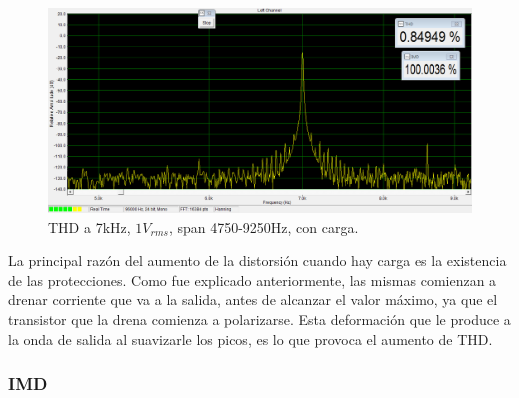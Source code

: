 \begin{figure}[H]
\centering
\includegraphics[width=\textwidth]{img/Distorsion/THD_7k_1V_carga_span_4750_9250.png}
\caption{THD a 7kHz, $1V_{rms}$, span 4750-9250Hz, con carga.}
\label{THD8} 
\end{figure}

La principal razón del aumento de la distorsión cuando hay carga es la existencia de las protecciones. Como fue explicado anteriormente, las mismas comienzan a drenar corriente que va a la salida, antes de alcanzar el valor máximo, ya que el transistor que la drena comienza a polarizarse. Esta deformación que le produce a la onda de salida al suavizarle los picos, es lo que provoca el aumento de THD.

\subsubsection*{IMD}